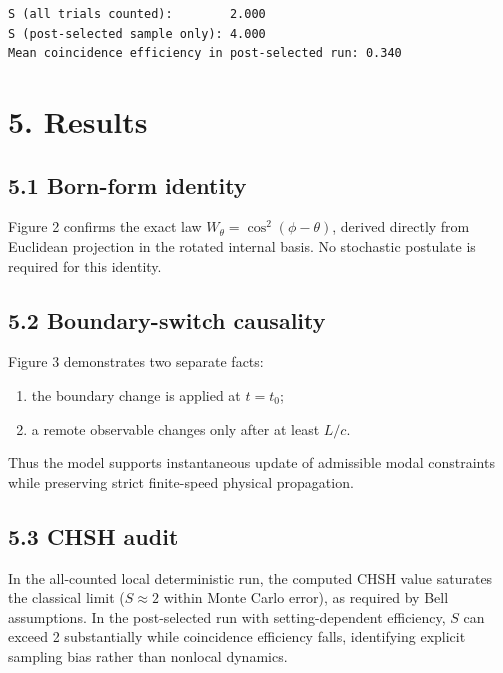 \documentclass[
  letterpaper,
  DIV=11,
  numbers=noendperiod]{scrartcl}
\providecommand{\tightlist}{%
  \setlength{\itemsep}{0pt}\setlength{\parskip}{0pt}}
\begin{document}
\begin{verbatim}
S (all trials counted):        2.000
S (post-selected sample only): 4.000
Mean coincidence efficiency in post-selected run: 0.340
\end{verbatim}

\section{5. Results}\label{results}

\subsection{5.1 Born-form identity}\label{born-form-identity}

Figure 2 confirms the exact law \(W_\theta=\cos^2(\phi-\theta)\),
derived directly from Euclidean projection in the rotated internal
basis. No stochastic postulate is required for this identity.

\subsection{5.2 Boundary-switch
causality}\label{boundary-switch-causality}

Figure 3 demonstrates two separate facts:

\begin{enumerate}
\def\labelenumi{\arabic{enumi}.}
\tightlist
\item
  the boundary change is applied at \(t=t_0\);
\item
  a remote observable changes only after at least \(L/c\).
\end{enumerate}

Thus the model supports instantaneous update of admissible modal
constraints while preserving strict finite-speed physical propagation.

\subsection{5.3 CHSH audit}\label{chsh-audit}

In the all-counted local deterministic run, the computed CHSH value
saturates the classical limit (\(S\approx2\) within Monte Carlo error),
as required by Bell assumptions. In the post-selected run with
setting-dependent efficiency, \(S\) can exceed 2 substantially while
coincidence efficiency falls, identifying explicit sampling bias rather
than nonlocal dynamics.
\end{document}
